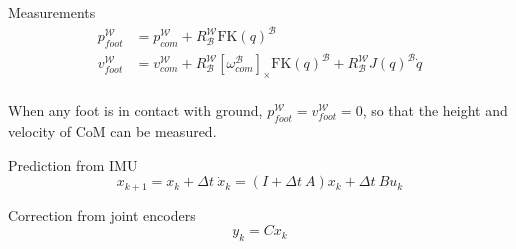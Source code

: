 \documentclass[11pt]{article}
\begin{document}
Measurements
\begin{align*}
  p_{foot}^\mathcal{W} &= 
  p_{com}^\mathcal{W} 
  + R_\mathcal{B}^\mathcal{W}\text{FK}(q)^\mathcal{B}\\
  v_{foot}^\mathcal{W} &= 
  v_{com}^\mathcal{W} 
  + R_\mathcal{B}^\mathcal{W}[\omega_{com}^\mathcal{B}]_\times \text{FK}(q)^\mathcal{B} 
  + R_\mathcal{B}^\mathcal{W} J(q)^\mathcal{B} \dot{q}\\
\end{align*}

When any foot is in contact with ground, \(p_{foot}^\mathcal{W}=v_{foot}^\mathcal{W}=0\), so that the height and velocity of CoM can be measured.

Prediction from IMU
\[
x_{k+1} = x_k + \Delta t\ \dot{x}_k =( I + \Delta t\ A) x_k +\Delta t\ B u_k
\]

Correction from joint encoders
\[
y_k = Cx_k
\]
\end{document}
